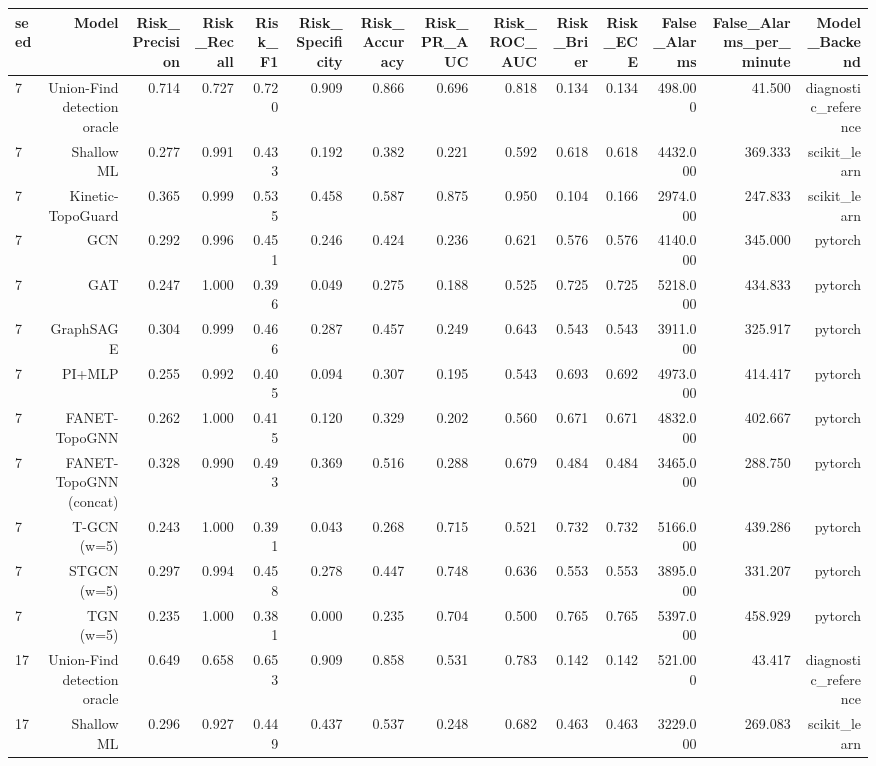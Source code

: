 \begin{tabular}{lrrrrrrrrrrrrr}
\toprule
seed & Model & Risk\_Precision & Risk\_Recall & Risk\_F1 & Risk\_Specificity & Risk\_Accuracy & Risk\_PR\_AUC & Risk\_ROC\_AUC & Risk\_Brier & Risk\_ECE & False\_Alarms & False\_Alarms\_per\_minute & Model\_Backend \\
\midrule
7 & Union-Find detection oracle & 0.714 & 0.727 & 0.720 & 0.909 & 0.866 & 0.696 & 0.818 & 0.134 & 0.134 & 498.000 & 41.500 & diagnostic\_reference \\
7 & Shallow ML & 0.277 & 0.991 & 0.433 & 0.192 & 0.382 & 0.221 & 0.592 & 0.618 & 0.618 & 4432.000 & 369.333 & scikit\_learn \\
7 & Kinetic-TopoGuard & 0.365 & 0.999 & 0.535 & 0.458 & 0.587 & 0.875 & 0.950 & 0.104 & 0.166 & 2974.000 & 247.833 & scikit\_learn \\
7 & GCN & 0.292 & 0.996 & 0.451 & 0.246 & 0.424 & 0.236 & 0.621 & 0.576 & 0.576 & 4140.000 & 345.000 & pytorch \\
7 & GAT & 0.247 & 1.000 & 0.396 & 0.049 & 0.275 & 0.188 & 0.525 & 0.725 & 0.725 & 5218.000 & 434.833 & pytorch \\
7 & GraphSAGE & 0.304 & 0.999 & 0.466 & 0.287 & 0.457 & 0.249 & 0.643 & 0.543 & 0.543 & 3911.000 & 325.917 & pytorch \\
7 & PI+MLP & 0.255 & 0.992 & 0.405 & 0.094 & 0.307 & 0.195 & 0.543 & 0.693 & 0.692 & 4973.000 & 414.417 & pytorch \\
7 & FANET-TopoGNN & 0.262 & 1.000 & 0.415 & 0.120 & 0.329 & 0.202 & 0.560 & 0.671 & 0.671 & 4832.000 & 402.667 & pytorch \\
7 & FANET-TopoGNN (concat) & 0.328 & 0.990 & 0.493 & 0.369 & 0.516 & 0.288 & 0.679 & 0.484 & 0.484 & 3465.000 & 288.750 & pytorch \\
7 & T-GCN (w=5) & 0.243 & 1.000 & 0.391 & 0.043 & 0.268 & 0.715 & 0.521 & 0.732 & 0.732 & 5166.000 & 439.286 & pytorch \\
7 & STGCN (w=5) & 0.297 & 0.994 & 0.458 & 0.278 & 0.447 & 0.748 & 0.636 & 0.553 & 0.553 & 3895.000 & 331.207 & pytorch \\
7 & TGN (w=5) & 0.235 & 1.000 & 0.381 & 0.000 & 0.235 & 0.704 & 0.500 & 0.765 & 0.765 & 5397.000 & 458.929 & pytorch \\
17 & Union-Find detection oracle & 0.649 & 0.658 & 0.653 & 0.909 & 0.858 & 0.531 & 0.783 & 0.142 & 0.142 & 521.000 & 43.417 & diagnostic\_reference \\
17 & Shallow ML & 0.296 & 0.927 & 0.449 & 0.437 & 0.537 & 0.248 & 0.682 & 0.463 & 0.463 & 3229.000 & 269.083 & scikit\_learn \\

\end{tabular}
